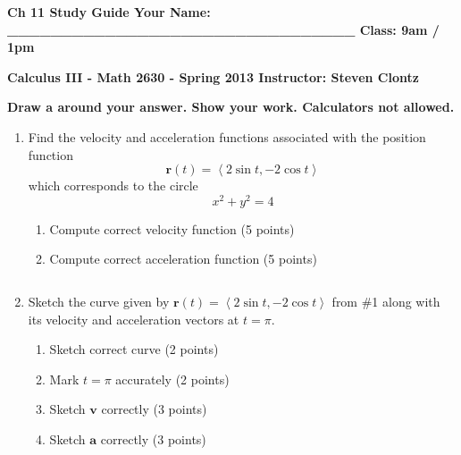 \documentclass[12pt]{article}
\newcommand{\up}{$~$\vspace*{-0.7in}}
\newcommand{\liner}{\noindent\underline{\hspace*{7in}}}
\newcommand{\spac}{\hspace*{3em}}
\renewcommand{\vec}{\mathbf}
\newcommand{\<}{\left<}
\renewcommand{\>}{\right>}
\begin{document}
\up

{\bf Ch 11 Study Guide \hspace*{1em} Your Name: \_\_\_\_\_\_\_\_\_\_\_\_\_\_\_\_\_\_\_\_\_\_\_\_\_\_\_\_\_\_\_\_ \hspace*{1em} Class: 9am / 1pm}

\vspace*{0.2in}

\centerline{ \bf Calculus III - Math 2630 - Spring 2013 \spac Instructor: Steven Clontz}

\vspace*{0.2in}

{\bf Draw a  around your answer. Show your work. Calculators not allowed.}

\indent\liner


\begin{enumerate}

\item Find the velocity and acceleration functions associated with the position function \[\vec{r}(t) = \left<2\sin t,-2\cos t\right>\] which corresponds to the circle \[x^2+y^2=4\]

  \begin{enumerate}
    \item Compute correct velocity function (5 points)
    \item Compute correct acceleration function (5 points)
  \end{enumerate}

\vspace*{6in}

\liner
\newpage\up

\item Sketch the curve given by $\vec{r}(t) = \left<2\sin t,-2\cos t\right>$ from \#1 along with its velocity and acceleration vectors at $t=\pi$.

  \begin{enumerate}
    \item Sketch correct curve (2 points)
    \item Mark $t=\pi$ accurately (2 points)
    \item Sketch $\vec{v}$ correctly (3 points)
    \item Sketch $\vec{a}$ correctly (3 points)
  \end{enumerate}

\vspace*{7.5in}

\liner
\newpage\up


\end{enumerate}
\end{document}
